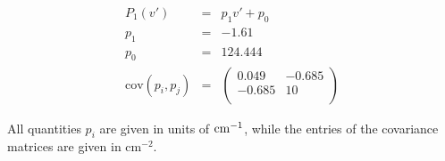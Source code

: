 \begin{itemize}
        \begin{eqnarray}
            P_1(v') &=& p_1 v' + p_0 \\
            p_1 &=& -1.61\\
            p_0 &=& 124.444 \\
            \mathrm{cov}(p_i, p_j) &=& 
            \begin{pmatrix}
                 0.049 & -0.685 \\
                 -0.685 & 10 \\
            \end{pmatrix}
        \end{eqnarray}
\end{itemize}
All quantities $p_i$ are given in units of $\mathrm{cm^{-1}}$, while the entries of the covariance 
matrices are given in $\mathrm{cm^{-2}}$.


